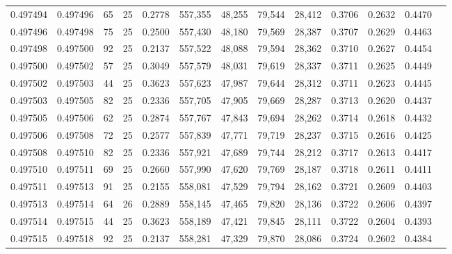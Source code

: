\begin{tabular}{rrrrrrrrrrrrr}
0.497494 & 0.497496 &    65 &  25 &                                     0.2778 & 557,355 &  48,255 &  79,544 &  28,412 & 0.3706 & 0.2632 & 0.4470 \\
0.497496 & 0.497498 &    75 &  25 &                                     0.2500 & 557,430 &  48,180 &  79,569 &  28,387 & 0.3707 & 0.2629 & 0.4463 \\
0.497498 & 0.497500 &    92 &  25 &                                     0.2137 & 557,522 &  48,088 &  79,594 &  28,362 & 0.3710 & 0.2627 & 0.4454 \\
0.497500 & 0.497502 &    57 &  25 &                                     0.3049 & 557,579 &  48,031 &  79,619 &  28,337 & 0.3711 & 0.2625 & 0.4449 \\
0.497502 & 0.497503 &    44 &  25 &                                     0.3623 & 557,623 &  47,987 &  79,644 &  28,312 & 0.3711 & 0.2623 & 0.4445 \\
0.497503 & 0.497505 &    82 &  25 &                                     0.2336 & 557,705 &  47,905 &  79,669 &  28,287 & 0.3713 & 0.2620 & 0.4437 \\
0.497505 & 0.497506 &    62 &  25 &                                     0.2874 & 557,767 &  47,843 &  79,694 &  28,262 & 0.3714 & 0.2618 & 0.4432 \\
0.497506 & 0.497508 &    72 &  25 &                                     0.2577 & 557,839 &  47,771 &  79,719 &  28,237 & 0.3715 & 0.2616 & 0.4425 \\
0.497508 & 0.497510 &    82 &  25 &                                     0.2336 & 557,921 &  47,689 &  79,744 &  28,212 & 0.3717 & 0.2613 & 0.4417 \\
0.497510 & 0.497511 &    69 &  25 &                                     0.2660 & 557,990 &  47,620 &  79,769 &  28,187 & 0.3718 & 0.2611 & 0.4411 \\
0.497511 & 0.497513 &    91 &  25 &                                     0.2155 & 558,081 &  47,529 &  79,794 &  28,162 & 0.3721 & 0.2609 & 0.4403 \\
0.497513 & 0.497514 &    64 &  26 &                                     0.2889 & 558,145 &  47,465 &  79,820 &  28,136 & 0.3722 & 0.2606 & 0.4397 \\
0.497514 & 0.497515 &    44 &  25 &                                     0.3623 & 558,189 &  47,421 &  79,845 &  28,111 & 0.3722 & 0.2604 & 0.4393 \\
0.497515 & 0.497518 &    92 &  25 &                                     0.2137 & 558,281 &  47,329 &  79,870 &  28,086 & 0.3724 & 0.2602 & 0.4384 \\

\end{tabular}
